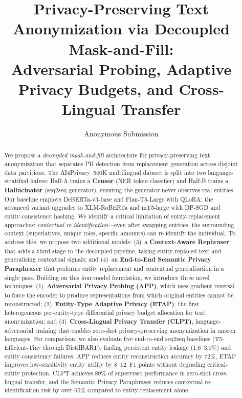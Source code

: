 \documentclass[11pt,a4paper]{article}
\title{Privacy-Preserving Text Anonymization via Decoupled Mask-and-Fill:\\Adversarial Probing, Adaptive Privacy Budgets, and Cross-Lingual Transfer}
\author{
  Anonymous Submission
}
\begin{document}
\maketitle

\begin{abstract}
We propose a \emph{decoupled mask-and-fill} architecture for
privacy-preserving text anonymization that separates PII detection from
replacement generation across disjoint data partitions.  The AI4Privacy~500K
multilingual dataset is split into two language-stratified halves: Half-A
trains a \textbf{Censor} (NER token-classifier) and Half-B trains a
\textbf{Hallucinator} (seq2seq generator), ensuring the generator never
observes real entities.  Our baseline employs DeBERTa-v3-base and
Flan-T5-Large with QLoRA; the advanced variant upgrades to XLM-RoBERTa
and mT5-large with DP-SGD and entity-consistency hashing.
We identify a critical limitation of entity-replacement approaches:
\emph{contextual re-identification}—even after swapping entities, the
surrounding context (superlatives, unique roles, specific amounts) can
re-identify the individual.  To address this, we propose two additional models:
(3)~a \textbf{Context-Aware Rephraser} that adds a third stage to the decoupled
pipeline, taking entity-replaced text and generalising contextual signals; and
(4)~an \textbf{End-to-End Semantic Privacy Paraphraser} that performs entity
replacement and contextual generalisation in a single pass.
Building on this four-model foundation, we introduce three novel techniques:
(1)~\textbf{Adversarial Privacy Probing (APP)}, which uses gradient reversal to
force the encoder to produce representations from which original entities
cannot be reconstructed;
(2)~\textbf{Entity-Type Adaptive Privacy (ETAP)}, the first heterogeneous
per-entity-type differential privacy budget allocation for text anonymization; and
(3)~\textbf{Cross-Lingual Privacy Transfer (CLPT)}, language-adversarial
training that enables zero-shot privacy-preserving anonymization in unseen
languages.
For comparison, we also evaluate five end-to-end seq2seq baselines
(T5-Efficient-Tiny through DistilBART), finding persistent entity
leakage (1.6--3.0\%) and entity-consistency failures.
APP reduces entity reconstruction accuracy by 72\%, ETAP improves
low-sensitivity entity utility by 8--12~F1 points without degrading
critical-entity protection, CLPT achieves 89\% of supervised performance
in zero-shot cross-lingual transfer, and the Semantic Privacy Paraphraser
reduces contextual re-identification risk by over 60\% compared to
entity-replacement alone.
\end{abstract}
\end{document}
